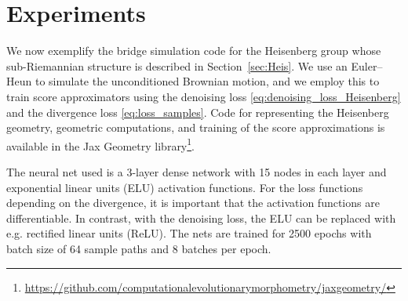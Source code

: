 \documentclass[10pt]{amsart}
\theoremstyle{remark}
\numberwithin{equation}{section}
\begin{document}
\section{Experiments}
\label{sec:experiments}
We now exemplify the bridge simulation code for the Heisenberg group whose sub-Riemannian structure is described in Section~\ref{sec:Heis}. We use an Euler--Heun to simulate the unconditioned Brownian motion, and we employ this to train score approximators using the denoising loss \eqref{eq:denoising_loss_Heisenberg} and the divergence loss \eqref{eq:loss_samples}. Code for representing the Heisenberg geometry, geometric computations, and training of the score approximations is available in the Jax Geometry library\footnote{\url{https://github.com/computationalevolutionarymorphometry/jaxgeometry/}}.

The neural net used is a 3-layer dense network with 15 nodes in each layer and exponential linear units (ELU) activation functions. For the loss functions depending on the divergence, it is important that the activation functions are differentiable. In contrast, with the denoising loss, the ELU can be replaced with e.g. rectified linear units (ReLU).
The nets are trained for 2500 epochs with batch size of 64 sample paths and 8 batches per epoch.
\end{document}

